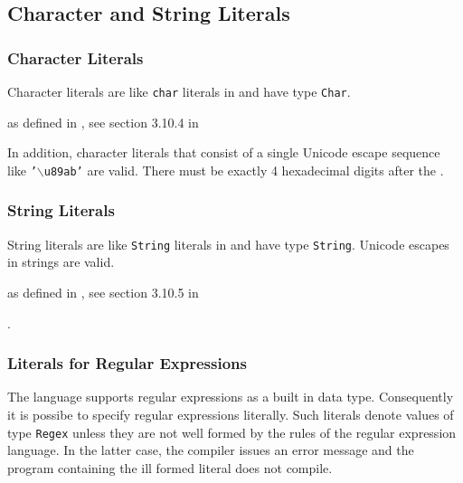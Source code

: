 \subsection{Character and String Literals}

\subsubsection{Character Literals} \label{charliteral}

Character literals are like \texttt{char} literals in \java{} and have type \texttt{Char}.

\begin{flushleft}
as defined in \java{}, see section 3.10.4 in \cite{langspec3}\\
\end{flushleft}

In addition, character literals that consist of a single Unicode escape sequence like \texttt{'$\backslash$u89ab'} are valid. There must be exactly 4 hexadecimal digits after the .

\subsubsection{String Literals}

String literals are like \texttt{String} literals in \java{} and have type \texttt{String}. Unicode escapes in strings are valid.

\begin{flushleft}
as defined in \java{}, see section 3.10.5 in \cite{langspec3}\\
\end{flushleft}

.

\subsubsection{Literals for Regular Expressions} \label{regexliteral}

The \frege{} language supports regular expressions as a built in data type. Consequently it is possibe to specify regular expressions literally. Such literals denote values of type \texttt{Regex} unless they are not well formed by the rules of the regular expression language. In the latter case, the compiler issues an error message and the program containing the ill formed literal does not compile.


